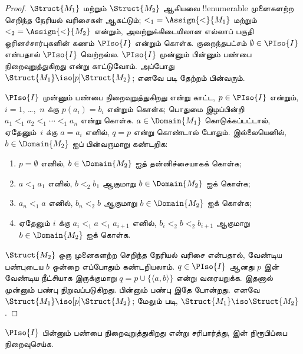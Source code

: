 \documentclass[../../../include/open-logic-section]{subfiles}
\begin{document}
\begin{proof}
  $\Struct{M_1}$ மற்றும் $\Struct{M_2}$ ஆகியவை !!{enumerable}
  முனைகளற்ற செறிந்த நேரியல் வரிசைகள் ஆகட்டும்; ${<_1} =
  \Assign{<}{M_1}$ மற்றும் ${<_2} =
  \Assign{<}{M_2}$ என்றும், அவற்றுக்கிடையிலான எல்லாப் பகுதி
  ஓரினச்சார்புகளின் கணம் $\PIso{I}$ என்றும் கொள்க. குறைந்தபட்சம்
  $\emptyset \in \PIso{I}$ என்பதால் $\PIso{I}$ வெற்றல்ல.
  $\PIso{I}$ முன்னும் பின்னும் பண்பை நிறைவுறுத்துகிறது என்று காட்டுவோம்.
  அப்போது $\Struct{M_1} \iso[p] \Struct{M_2}$; எனவே
   படி தேற்றம் பின்வரும்.

  $\PIso{I}$ முன்னும் பண்பை நிறைவுறுத்துகிறது என்று காட்ட,
  $p \in
  \PIso{I}$ என்றும், $i = 1$, \dots,~$n$ க்கு $p(a_i) = b_i$ என்றும்
  கொள்க; பொதுமை இழப்பின்றி $a_1 <_1 a_2 <_1 \cdots <_1
  a_n$ என்று கொள்க. $a \in \Domain{M_1}$ கொடுக்கப்பட்டால்,
  ஏதேனும்~$i$ க்கு $a = a_i$ எனில், $q = p$ என்று கொண்டால் போதும்.
  இல்லையெனில், $b \in \Domain{M_2}$ ஐப் பின்வருமாறு கண்டறிக:
  \begin{enumerate}
  \item $p = \emptyset$ எனில், $b \in \Domain{M_2}$ ஐத் தன்னிச்சையாகக் கொள்க;
  \item $a <_1 a_1$ எனில், $b <_2
    b_1$ ஆகுமாறு $b \in \Domain{M_2}$ ஐக் கொள்க;
  \item $a_n <_1 a$ எனில், $b_n <_2 b$ ஆகுமாறு
    $b \in \Domain{M_2}$ ஐக் கொள்க;
 \item ஏதேனும் $i$ க்கு $a_i <_1 a <_1 a_{i+1}$ எனில்,
   $b_i <_2 b <_2 b_{i+1}$ ஆகுமாறு $b \in
   \Domain{M_2}$ ஐக் கொள்க.
  \end{enumerate}
  $\Struct{M_2}$ ஒரு முனைகளற்ற செறிந்த நேரியல் வரிசை என்பதால்,
  வேண்டிய பண்புடைய $b$ ஒன்றை எப்போதும் கண்டறியலாம்.
  $q \in \PIso{I}$ ஆனது $p$ இன் வேண்டிய நீட்சியாக இருக்குமாறு
  $q = p \cup \{ \langle a, b \rangle \}$ என்று வரையறுக்க.
  இதனால் முன்னும் பண்பு நிறுவப்படுகிறது. பின்னும் பண்பு இதே போன்றது.
  எனவே $\Struct{M_1} \iso[p] \Struct{M_2}$; மேலும்
   படி, $\Struct{M_1} \iso
  \Struct{M_2}$.
\end{proof}

\begin{prob}
  $\PIso{I}$ பின்னும் பண்பை நிறைவுறுத்துகிறது என்று சரிபார்த்து,
   இன் நிரூபிப்பை நிறைவுசெய்க.
\end{prob}
\end{document}
